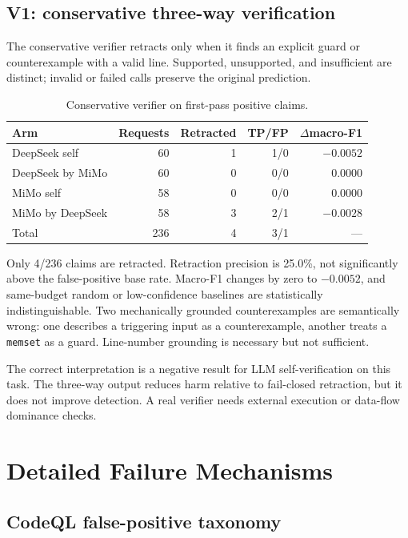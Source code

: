 \documentclass[conference]{IEEEtran}
\begin{document}
\subsection{V1: conservative three-way verification}

The conservative verifier retracts only when it finds an explicit guard or counterexample with a valid line. Supported, unsupported, and insufficient are distinct; invalid or failed calls preserve the original prediction.

\begin{table}[t]
\centering
\caption{Conservative verifier on first-pass positive claims.}
\label{tab:verifier}
\footnotesize
\setlength{\tabcolsep}{3pt}
\begin{tabular}{@{}lrrrr@{}}
\toprule
Arm & Requests & Retracted & TP/FP & $\Delta$macro-F1 \\
\midrule
DeepSeek self & 60 & 1 & 1/0 & $-0.0052$ \\
DeepSeek by MiMo & 60 & 0 & 0/0 & 0.0000 \\
MiMo self & 58 & 0 & 0/0 & 0.0000 \\
MiMo by DeepSeek & 58 & 3 & 2/1 & $-0.0028$ \\
\midrule
Total & 236 & 4 & 3/1 & --- \\
\bottomrule
\end{tabular}
\end{table}

Only 4/236 claims are retracted. Retraction precision is 25.0\%, not significantly above the false-positive base rate. Macro-F1 changes by zero to $-0.0052$, and same-budget random or low-confidence baselines are statistically indistinguishable. Two mechanically grounded counterexamples are semantically wrong: one describes a triggering input as a counterexample, another treats a \texttt{memset} as a guard. Line-number grounding is necessary but not sufficient.

The correct interpretation is a negative result for LLM self-verification on this task. The three-way output reduces harm relative to fail-closed retraction, but it does not improve detection. A real verifier needs external execution or data-flow dominance checks.

\section{Detailed Failure Mechanisms}
\label{sec:mechanisms}

\subsection{CodeQL false-positive taxonomy}
\end{document}
